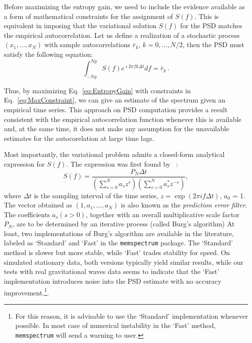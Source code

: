 \documentclass{aa}
\begin{document}
Before maximizing the entropy gain, we need to include the evidence available as a form of mathematical constraints for the assignment of $S(f)$.
This is equivalent in imposing that the variational solution $S(f)$ for the PSD matches the empirical autocorrelation.
Let us define a realization of a stochastic process $(x_1,\ldots,x_N)$ with sample autocorrelations $\bar r_k,\,k=0,\ldots, N/2$, then the PSD must satisfy the following equation:
\begin{equation}\label{eq:MaxConstraint}
\int_{-Ny}^{Ny} S(f) e^{\imath 2 \pi f k \Delta t} df = \bar r_{k}\,.
\end{equation}

Thus, by maximizing Eq.~\eqref{eq:EntropyGain} with constraints in Eq.~\eqref{eq:MaxConstraint}, we can give an estimate of the spectrum given an empirical time series.
This approach on PSD computation provides a result consistent with the empirical autocorrelation function whenever this is available and, at the same time, it does not make any assumption for the unavailable estimates for the autocorelation at large time lags.

Most importantly, the variational problem admits a closed-form analytical expression for $S(f)$.
The expression was first found by ~\citet{burg1975maximum}:
\begin{equation}\label{eq:MESApsd}
    S(f) = \frac{P_N \Delta t}{\left(\sum_{s=0}^{N} a_s z^s\right)\left(\sum_{s = 0}^N a^*_s z^{-s}\right)}, 
\end{equation}
where $\Delta t$ is the sampling interval of the time series, $z=\exp{(2\pi i f\Delta t)}$, $a_0$ = 1.
The vector obtained as $(1, a_1, \dots, a_N)$ is also known as the \textit{prediction error filter}.
The coefficients $a_s (s > 0)$, together with an overall multiplicative scale factor $P_N$, are to be determined by an iterative process (called Burg's algorithm)
At least, two implementations of Burg's algorithm are available in the literature, labeled as `Standard' \cite{} and `Fast' \cite{} in the \texttt{memspectrum} package. The `Standard' method is slower but more stable, while `Fast' trades stability for speed.
On simulated stationary data, both versions typically yield similar results, while our tests with real gravitational waves data seems to indicate that the `Fast' implementation introduces noise into the PSD estimate with no accuracy improvement.\footnote{For this reason, it is advisable to use the `Standard' implementation whenever possible. In most case of numerical instability in the `Fast' method, \texttt{memspectrum} will send a warning to user.}.
\end{document}
